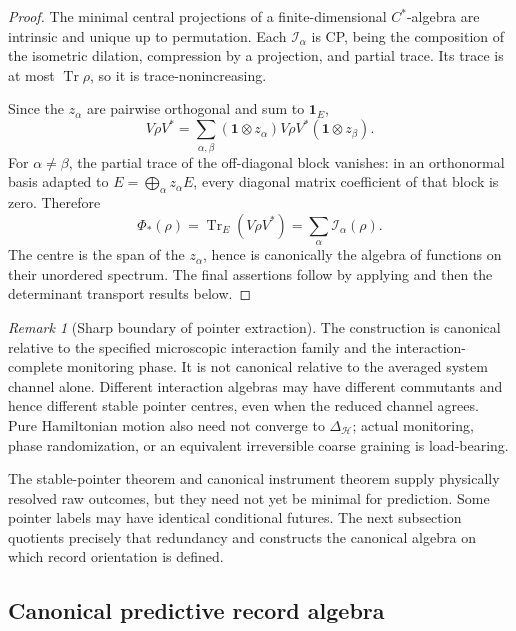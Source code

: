 \documentclass[11pt]{article}
\theoremstyle{definition}
\theoremstyle{remark}
\newtheorem{remark}[theorem]{Remark}
\newcommand{\one}{\mathbf 1}
\newcommand{\Tr}{\operatorname{Tr}}
\begin{document}
\begin{proof}
The minimal central projections of a finite-dimensional \(C^*\)-algebra are
intrinsic and unique up to permutation.  Each \(\mathcal I_\alpha\) is CP,
being the composition of the isometric dilation, compression by a projection,
and partial trace.  Its trace is at most \(\Tr\rho\), so it is
trace-nonincreasing.

Since the \(z_\alpha\) are pairwise orthogonal and sum to \(\one_E\),
\[
 V\rho V^*
 =
 \sum_{\alpha,\beta}
 (\one\otimes z_\alpha)V\rho V^*(\one\otimes z_\beta).
\]
For \(\alpha\ne\beta\), the partial trace of the off-diagonal block vanishes:
in an orthonormal basis adapted to
\(E=\bigoplus_\alpha z_\alpha E\), every diagonal matrix coefficient of that
block is zero.  Therefore
\[
 \Phi_*(\rho)=\Tr_E(V\rho V^*)
 =\sum_\alpha\mathcal I_\alpha(\rho).
\]
The centre is the span of the \(z_\alpha\), hence is canonically the algebra
of functions on their unordered spectrum.  The final assertions follow by
applying 
and then the determinant transport results below.
\end{proof}

\begin{remark}[Sharp boundary of pointer extraction]
\label{rem:pointer-extraction-boundary}
The construction is canonical relative to the specified microscopic
interaction family and the interaction-complete monitoring phase.  It is not
canonical relative to the averaged system channel alone.  Different
interaction algebras may have different commutants and hence different stable
pointer centres, even when the reduced channel agrees.  Pure Hamiltonian
motion also need not converge to \(\Delta_{\mathscr H}\); actual monitoring,
phase randomization, or an equivalent irreversible coarse graining is
load-bearing.
\end{remark}


The stable-pointer theorem and canonical instrument theorem supply physically
resolved raw outcomes, but they need not yet be minimal for prediction.  Some
pointer labels may have identical conditional futures.  The next subsection
quotients precisely that redundancy and constructs the canonical algebra on which
record orientation is defined.

\subsection{Canonical predictive record algebra}
\end{document}
